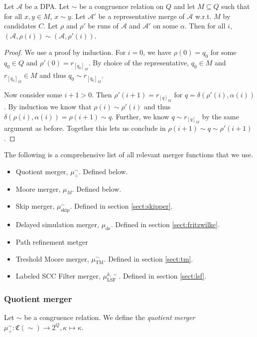 \begin{lem}
	Let $\mathcal{A}$ be a DPA. Let $\sim$ be a congruence relation on $Q$ and let $M \subseteq Q$ such that for all $x, y \in M$, $x \sim y$. Let $\mathcal{A}'$ be a representative merge of $\mathcal{A}$ w.r.t. $M$ by candidates $C$. Let $\rho$ and $\rho'$ be runs of $\mathcal{A}$ and $\mathcal{A}'$ on some $\alpha$. Then for all $i$, $(\mathcal{A}, \rho(i)) \sim (\mathcal{A}, \rho'(i))$.
	\label{lem:general:cong_stays_in_merge}
\end{lem}

\begin{proof}
	We use a proof by induction. For $i = 0$, we have $\rho(0) = q_0$ for some $q_0 \in Q$ and $\rho'(0) = r_{[q_0]_M}$. By choice of the representative, $q_0 \in M$ and $r_{[q_0]_M} \in M$ and thus $q_0 \sim r_{[q_0]_M}$.
	
	Now consider some $i+1 > 0$. Then $\rho'(i+1) = r_{[q]_M}$ for $q = \delta(\rho'(i), \alpha(i))$. By induction we know that $\rho(i) \sim \rho'(i)$ and thus $\delta(\rho(i), \alpha(i)) = \rho(i+1) \sim q$. Further, we know $q \sim r_{[q]_M}$ by the same argument as before. Together this lets us conclude in $\rho(i+1) \sim q \sim \rho'(i+1)$.
\end{proof}

\vspace{10pt}

The following is a comprehensive list of all relevant merger functions that we use.

\begin{itemize}
	\item Quotient merger, $\mu_\div^\sim$. Defined below.
	\item Moore merger, $\mu_M$. Defined below.
	\item Skip merger, $\mu_\text{skip}^\sim$. Defined in section \ref{sect:skipper}.
	\item Delayed simulation merger, $\mu_\text{de}$. Defined in section \ref{sect:fritzwilke}.
	\item Path refinement metger %
	\item Treshold Moore merger, $\mu_\text{TM}^\sim$. Defined in section \ref{sect:tm}.
	\item Labeled SCC Filter merger, $\mu_\text{LSF}^{k,\sim}$. Defined in section \ref{sect:lsf}.
\end{itemize}

\vspace{5pt}

\subsubsection{Quotient merger}
\begin{defn}
	Let $\sim$ be a congruence relation. We define the \emph{quotient merger} $\mu^\sim_\div : \mathfrak{C}(\sim) \rightarrow 2^Q, \kappa \mapsto \kappa$. 
\end{defn}


